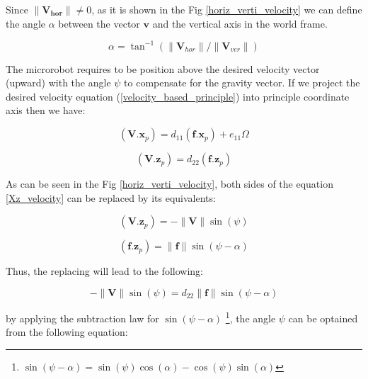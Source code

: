 \documentclass[12pt,a4paper,titlepage]{report}
\begin{document}
Since ${\| \bm{{V}_{hor}}\|} \neq 0$, as it is shown in the Fig \ref{horiz_verti_velocity} we can define 
the angle $\alpha$ between the vector $\bm{v}$ and the vertical axis in the world frame.



\begin{equation}
\alpha = {\tan}^{-1} ({\| \bm{V}_{hor} \|} / {\| \bm{V}_{ver} \|})
\label{alpha_velocity}  
\end{equation}

The microrobot requires to be position above the desired velocity vector (upward) with the angle $\psi$ 
 to compensate for the gravity vector. If we project the desired velocity equation (\ref{velocity_based_principle})
into principle coordinate axis then we have:


\begin{equation}
(\bm{V} . \bm{x}_p) = d_{11} \left ({\bm{f} . {\bm{x}}_p   }  \right) + e_{11} \Omega 
\label{Xp_velocity}  
\end{equation}




\begin{equation}
(\bm{V} . \bm{z}_p) = d_{22} \left ({\bm{f} . {\bm{z}}_p   }  \right)
\label{Xz_velocity}  
\end{equation}

As can be seen in the Fig \ref{horiz_verti_velocity}, both sides of the 
equation \ref{Xz_velocity} can be replaced by its equivalents:


\begin{equation}
(\bm{V} . \bm{z}_p) = - {\| \bm{V} \|} \sin(\psi)
\label{Xz_velocity_equival}  
\end{equation}


\begin{equation}
(\bm{f} . \bm{z}_p) = {\| \bm{f} \|} \sin(\psi - \alpha)
\label{Xz_velocity_equivali}  
\end{equation}



Thus, the replacing will lead to the following:


\begin{equation}
 - {\| \bm{V} \|} \sin(\psi) = d_{22} {\| \bm{f} \|} \sin(\psi - \alpha)
\label{finding_psi}  
\end{equation}

by applying the subtraction law for $ \sin(\psi - \alpha)$ \footnote{$\sin(\psi - \alpha) = 
\sin(\psi) \cos(\alpha) - \cos(\psi) \sin(\alpha)$},
 the angle $\psi$ can be optained from the following
equation:
\end{document}
